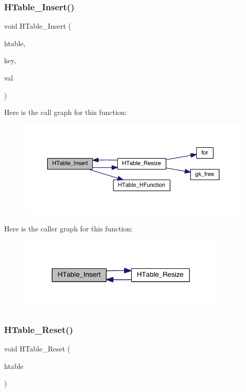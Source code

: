 \subsubsection{\texorpdfstring{H\+Table\+\_\+\+Insert()}{HTable\_Insert()}}
{\footnotesize\ttfamily void H\+Table\+\_\+\+Insert (\begin{DoxyParamCaption}\item[{\hyperlink{a00650}{gk\+\_\+\+H\+Table\+\_\+t} $\ast$}]{htable,  }\item[{int}]{key,  }\item[{int}]{val }\end{DoxyParamCaption})}

Here is the call graph for this function\+:\nopagebreak
\begin{figure}[H]
\begin{center}
\leavevmode
\includegraphics[width=350pt]{a00098_a39853dc7129323e7846d895c9026ad6f_cgraph}
\end{center}
\end{figure}
Here is the caller graph for this function\+:\nopagebreak
\begin{figure}[H]
\begin{center}
\leavevmode
\includegraphics[width=282pt]{a00098_a39853dc7129323e7846d895c9026ad6f_icgraph}
\end{center}
\end{figure}
\mbox{\label{a00098_a8a914231592293527bd1f42cdfb346d4}} 
\subsubsection{\texorpdfstring{H\+Table\+\_\+\+Reset()}{HTable\_Reset()}}
{\footnotesize\ttfamily void H\+Table\+\_\+\+Reset (\begin{DoxyParamCaption}\item[{\hyperlink{a00650}{gk\+\_\+\+H\+Table\+\_\+t} $\ast$}]{htable }\end{DoxyParamCaption})}

